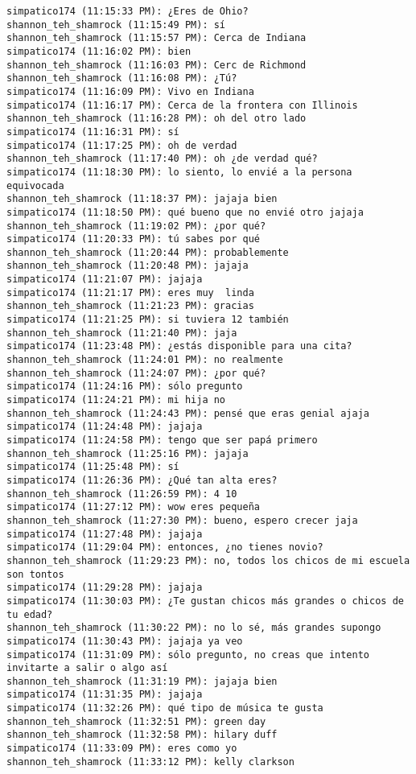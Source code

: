 \begin{verbatim}
simpatico174 (11:15:33 PM): ¿Eres de Ohio?
shannon_teh_shamrock (11:15:49 PM): sí
shannon_teh_shamrock (11:15:57 PM): Cerca de Indiana
simpatico174 (11:16:02 PM): bien
shannon_teh_shamrock (11:16:03 PM): Cerc de Richmond
shannon_teh_shamrock (11:16:08 PM): ¿Tú?
simpatico174 (11:16:09 PM): Vivo en Indiana
simpatico174 (11:16:17 PM): Cerca de la frontera con Illinois
shannon_teh_shamrock (11:16:28 PM): oh del otro lado
simpatico174 (11:16:31 PM): sí
simpatico174 (11:17:25 PM): oh de verdad
shannon_teh_shamrock (11:17:40 PM): oh ¿de verdad qué?
simpatico174 (11:18:30 PM): lo siento, lo envié a la persona equivocada
shannon_teh_shamrock (11:18:37 PM): jajaja bien
simpatico174 (11:18:50 PM): qué bueno que no envié otro jajaja 
shannon_teh_shamrock (11:19:02 PM): ¿por qué?
simpatico174 (11:20:33 PM): tú sabes por qué
shannon_teh_shamrock (11:20:44 PM): probablemente
shannon_teh_shamrock (11:20:48 PM): jajaja
simpatico174 (11:21:07 PM): jajaja
simpatico174 (11:21:17 PM): eres muy  linda
shannon_teh_shamrock (11:21:23 PM): gracias
simpatico174 (11:21:25 PM): si tuviera 12 también
shannon_teh_shamrock (11:21:40 PM): jaja
simpatico174 (11:23:48 PM): ¿estás disponible para una cita?
shannon_teh_shamrock (11:24:01 PM): no realmente
shannon_teh_shamrock (11:24:07 PM): ¿por qué?
simpatico174 (11:24:16 PM): sólo pregunto
simpatico174 (11:24:21 PM): mi hija no
shannon_teh_shamrock (11:24:43 PM): pensé que eras genial ajaja
simpatico174 (11:24:48 PM): jajaja
simpatico174 (11:24:58 PM): tengo que ser papá primero
shannon_teh_shamrock (11:25:16 PM): jajaja
simpatico174 (11:25:48 PM): sí
simpatico174 (11:26:36 PM): ¿Qué tan alta eres? 
shannon_teh_shamrock (11:26:59 PM): 4 10
simpatico174 (11:27:12 PM): wow eres pequeña
shannon_teh_shamrock (11:27:30 PM): bueno, espero crecer jaja
simpatico174 (11:27:48 PM): jajaja
simpatico174 (11:29:04 PM): entonces, ¿no tienes novio?
shannon_teh_shamrock (11:29:23 PM): no, todos los chicos de mi escuela son tontos
simpatico174 (11:29:28 PM): jajaja
simpatico174 (11:30:03 PM): ¿Te gustan chicos más grandes o chicos de tu edad?
shannon_teh_shamrock (11:30:22 PM): no lo sé, más grandes supongo
simpatico174 (11:30:43 PM): jajaja ya veo
simpatico174 (11:31:09 PM): sólo pregunto, no creas que intento invitarte a salir o algo así
shannon_teh_shamrock (11:31:19 PM): jajaja bien
simpatico174 (11:31:35 PM): jajaja
simpatico174 (11:32:26 PM): qué tipo de música te gusta
shannon_teh_shamrock (11:32:51 PM): green day
shannon_teh_shamrock (11:32:58 PM): hilary duff
simpatico174 (11:33:09 PM): eres como yo
shannon_teh_shamrock (11:33:12 PM): kelly clarkson

\end{verbatim}
